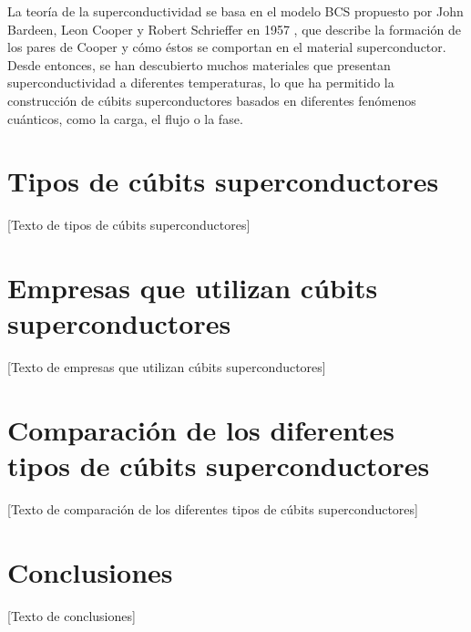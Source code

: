 \documentclass[12pt]{article}
\begin{document}
La teoría de la superconductividad se basa en el modelo BCS propuesto por John Bardeen, Leon Cooper y Robert Schrieffer en 1957 \cite{bardeen_theory_1957}, que describe la formación de los pares de Cooper y cómo éstos se comportan en el material superconductor. Desde entonces, se han descubierto muchos materiales que presentan superconductividad a diferentes temperaturas, lo que ha permitido la construcción de cúbits superconductores basados en diferentes fenómenos cuánticos, como la carga, el flujo o la fase.

\section{Tipos de cúbits superconductores}

[Texto de tipos de cúbits superconductores]

\section{Empresas que utilizan cúbits superconductores}

[Texto de empresas que utilizan cúbits superconductores]

\section{Comparación de los diferentes tipos de cúbits superconductores}

[Texto de comparación de los diferentes tipos de cúbits superconductores]

\section{Conclusiones}

[Texto de conclusiones]


\cite{barends_superconducting_2014}
\printbibliography
\end{document}
